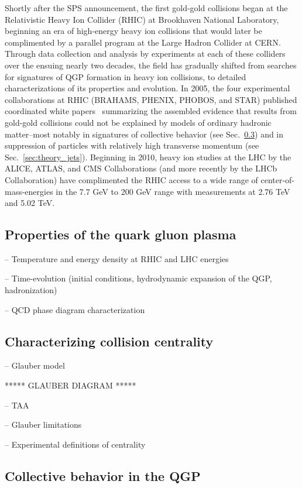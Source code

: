 Shortly after the SPS announcement, the first gold-gold collisions began at the Relativistic Heavy Ion Collider (RHIC) at Brookhaven National Laboratory, beginning an era of high-energy heavy ion collisions that would later be complimented by a parallel program at the Large Hadron Collider at CERN.  Through data collection and analysis by experiments at each of these colliders over the ensuing nearly two decades, the field has gradually shifted from searches for signatures of QGP formation in heavy ion collisions, to detailed characterizations of its properties and evolution.  In 2005, the four experimental collaborations at RHIC (BRAHAMS, PHENIX, PHOBOS, and STAR) published coordinated white papers~\cite{Arsene:2004fa, Adcox:2004mh, Back:2004je, Adams:2005dq} summarizing the assembled evidence that results from  gold-gold collisions could not be explained by models of ordinary hadronic matter--most notably in signatures of collective behavior (see Sec.~\ref{sec:theory_collectivity}) and in suppression of particles with relatively high transverse momentum (see Sec.~\ref{sec:theory_jets}).  Beginning in 2010, heavy ion studies at the LHC by the ALICE, ATLAS, and CMS Collaborations (and more recently by the LHCb Collaboration) have complimented the RHIC access to a wide range of center-of-mass-energies in the 7.7 GeV to 200 GeV range with measurements at 2.76 TeV and 5.02 TeV.

\subsection{Properties of the quark gluon plasma}

-- Temperature and energy density at RHIC and LHC energies

-- Time-evolution (initial conditions, hydrodynamic expansion of the QGP, hadronization)

-- QCD phase diagram characterization

\subsection{Characterizing collision centrality}
\label{sec:glauber}

-- Glauber model

***** GLAUBER DIAGRAM *****

-- TAA

-- Glauber limitations

-- Experimental definitions of centrality


\subsection{Collective behavior in the QGP}
\label{sec:theory_collectivity}

